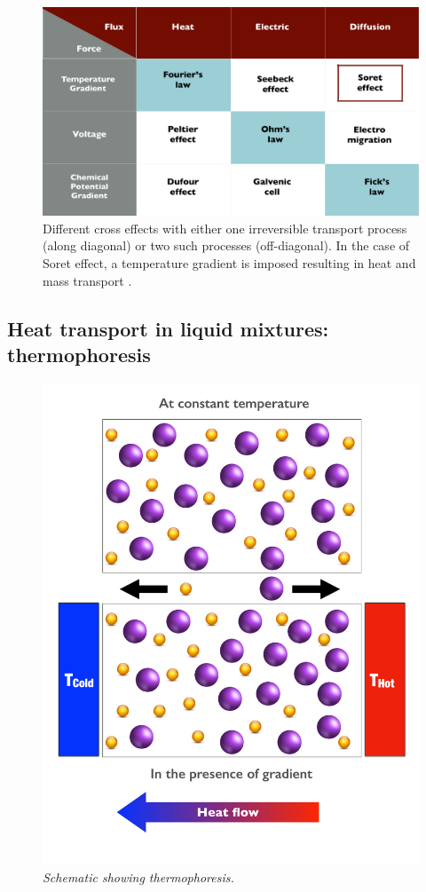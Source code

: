     \begin{figure}[hbt!]
	\includegraphics[width=14cm]{figs/schematicCross.pdf}
	\centering
	\caption[{\em Interferring irreversible transport processes}]{Different cross effects with either one irreversible transport process (along diagonal) or two such processes (off-diagonal). In the case of Soret effect, a temperature gradient is imposed resulting in heat and mass transport \cite{degroot}.\label{schematicCross}}
    \end{figure}
    
    \subsection{Heat transport in liquid mixtures: thermophoresis}
    
     \begin{figure}[hbt!]
	\includegraphics[width=14cm]{figs/thermophoresis.pdf}
	\centering
	\caption{{\em Schematic showing thermophoresis.}  \label{thermophoresis}}
    \end{figure}
    
